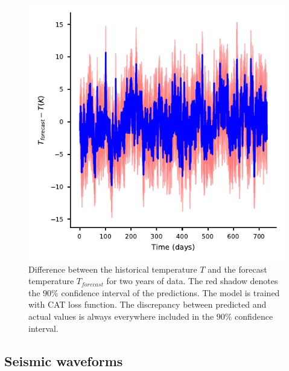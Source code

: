 \documentclass[twocolumn,showpacs,preprintnumbers,nofootinbib,prd,
superscriptaddress,10pt]{revtex4-1}
\begin{document}
\begin{figure}
	\caption{Difference between the historical temperature $T$ and the forecast temperature $T_{forecast}$ for two years of data. The red shadow denotes the $90\%$ confidence interval of the predictions. The model is trained with CAT loss function. The discrepancy between predicted and actual values is always everywhere included in the $90\%$ confidence interval.}
	\label{fig:temp_forecast}
	\includegraphics{Images/climate_plots/forecast_accuracy.pdf}
\end{figure}

\subsection{Seismic waveforms} \label{sec:seismic_timeseries}
\blindtext

\cite{seismic_data}

\blindtext
\end{document}
